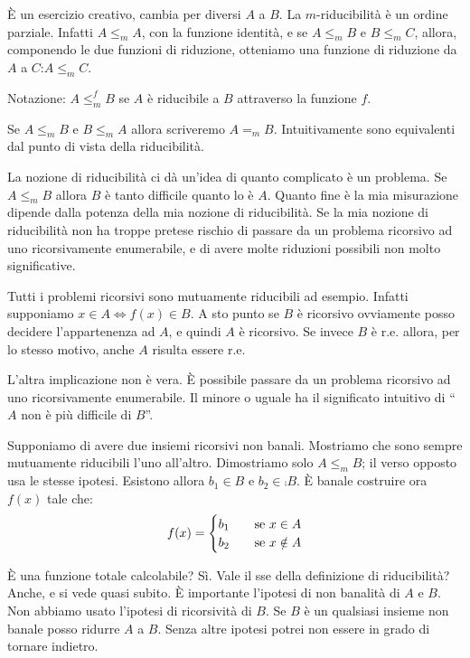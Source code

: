 È un esercizio creativo, cambia per diversi $A$ a $B$. La $m$-riducibilità è un ordine parziale.
Infatti $A \leq_{m} A$, con la funzione identità, e se $A \leq_{m} B$ e $B \leq_{m} C$, allora, componendo le due
funzioni di riduzione, otteniamo una funzione di riduzione da $A$ a $C$:$A \leq_{m} C$. 

Notazione: $A \leq_{m}^{f} B$ se $A$ è riducibile a $B$ attraverso la funzione $f$.

Se $A \leq_{m} B$ e $B \leq_{m} A$ allora scriveremo $A =_{m} B$. Intuitivamente sono equivalenti
dal punto di vista della riducibilità.

La nozione di riducibilità ci dà un'idea di quanto complicato è un problema. Se $A \leq_{m} B$
allora $B$ è tanto difficile quanto lo è $A$. Quanto fine è la mia misurazione dipende dalla potenza
della mia nozione di riducibilità. Se la mia nozione di riducibilità non ha troppe pretese rischio
di passare da un problema ricorsivo ad uno ricorsivamente enumerabile, e di avere molte riduzioni
possibili non molto significative.

Tutti i problemi ricorsivi sono mutuamente riducibili ad esempio. Infatti supponiamo $x \in A \iff
f(x) \in B$. A sto punto se $B$ è ricorsivo ovviamente posso decidere l'appartenenza ad $A$, e
quindi $A$ è ricorsivo. Se invece $B$ è r.e. allora, per lo stesso motivo, anche $A$ risulta essere
r.e.

L'altra implicazione non è vera. È possibile passare da un problema ricorsivo ad uno
ricorsivamente enumerabile. Il minore o uguale ha il significato intuitivo di ``$A$ non è più
difficile di $B$''.

Supponiamo di avere due insiemi ricorsivi non banali. Mostriamo che sono sempre mutuamente
riducibili l'uno all'altro. Dimostriamo solo $A \leq_{m} B$; il verso opposto usa le stesse ipotesi.
Esistono allora $b_{1} \in B$ e $b_{2} \in \comp{B}$. È banale costruire ora $f(x)$ tale che:
\begin{equation*}
    f(x) =
    \begin{cases}
        b_{1} \quad &\text{se $x \in A$} \\
        b_{2} \quad &\text{se $x \notin A$}
    \end{cases}
\end{equation*}

È una funzione totale calcolabile? Sì. Vale il sse della definizione di riducibilità? Anche, e si
vede quasi subito. È importante l'ipotesi di non banalità di $A$ e $B$. Non abbiamo usato l'ipotesi di
ricorsività di $B$. Se $B$ è un qualsiasi insieme non banale posso ridurre $A$ a $B$. Senza altre ipotesi
potrei non essere in grado di tornare indietro.

